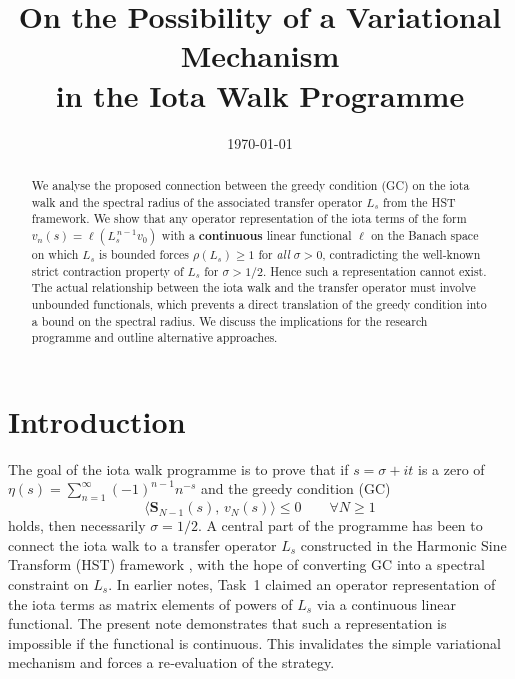 \documentclass[11pt,a4paper]{article}
\title{\bf On the Possibility of a Variational Mechanism\\ in the Iota Walk Programme}
\author{}
\date{\today}
\begin{document}
\maketitle

\begin{abstract}
We analyse the proposed connection between the greedy condition (GC) on the iota walk and the spectral radius of the associated transfer operator \(L_s\) from the HST framework.  We show that any operator representation of the iota terms of the form \(v_n(s) = \ell(L_s^{\,n-1} v_0)\) with a \textbf{continuous} linear functional \(\ell\) on the Banach space on which \(L_s\) is bounded forces \(\rho(L_s) \ge 1\) for \emph{all} \(\sigma > 0\), contradicting the well‑known strict contraction property of \(L_s\) for \(\sigma > 1/2\).  Hence such a representation cannot exist.  The actual relationship between the iota walk and the transfer operator must involve unbounded functionals, which prevents a direct translation of the greedy condition into a bound on the spectral radius.  We discuss the implications for the research programme and outline alternative approaches.
\end{abstract}

\section{Introduction}
The goal of the iota walk programme is to prove that if \(s = \sigma + it\) is a zero of \(\eta(s) = \sum_{n=1}^\infty (-1)^{n-1} n^{-s}\) and the greedy condition (GC)
\[
\langle \mathbf{S}_{N-1}(s),\, v_N(s)\rangle \le 0 \qquad \forall N\ge 1
\]
holds, then necessarily \(\sigma = 1/2\).  A central part of the programme has been to connect the iota walk to a transfer operator \(L_s\) constructed in the Harmonic Sine Transform (HST) framework \cite{HST}, with the hope of converting GC into a spectral constraint on \(L_s\).  In earlier notes, Task~1 \cite{Task1} claimed an operator representation of the iota terms as matrix elements of powers of \(L_s\) via a continuous linear functional.  The present note demonstrates that such a representation is impossible if the functional is continuous.  This invalidates the simple variational mechanism and forces a re‑evaluation of the strategy.
\end{document}
